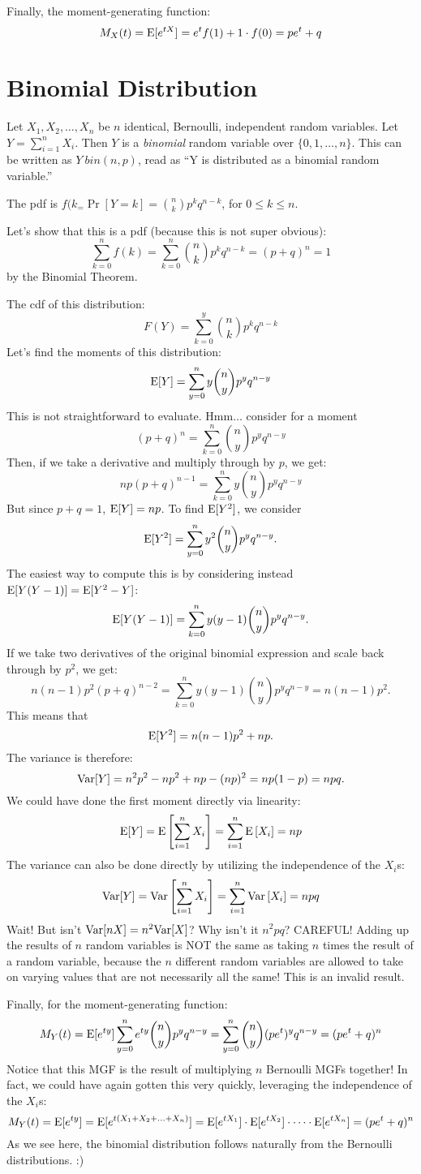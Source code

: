 \documentclass[../main.tex]{subfiles}
\begin{document}
Finally, the moment-generating function: 
\[
    M_X(t) = \mathrm E[e^{tX}] = e^t f(1) + 1 \cdot f(0) = p e^t + q 
\]
\section{Binomial Distribution}
Let $X_1, X_2, \dots, X_n$ be $n$ identical, Bernoulli, independent random variables. Let $Y = \sum_{i=1}^n X_i$. Then $Y$ is a \textit{binomial} random variable over $\{0, 1, \dots, n\}$. This can be written as $Y ~ bin(n,p)$, read as ``Y is distributed as a binomial random variable.''

The pdf is $f(k_ = \Pr[Y=k] = \binom{n}{k} p^k q^{n-k}$, for $0 \leq k \leq n$. 

Let's show that this is a pdf (because this is not super obvious): 
\[
    \sum_{k=0}^n f(k) = \sum_{k=0}^n \binom{n}{k} p^k q^{n-k} = (p+q)^n = 1
\]
by the Binomial Theorem. 

The cdf of this distribution: 
\[
    F(Y) = \sum_{k=0}^y \binom{n}{k} p^k q^{n-k}
\]
Let's find the moments of this distribution: 
\[
    \mathrm E[Y] = \sum_{y=0}^n y \binom{n}{y} p^y q^{n-y}
\]
This is not straightforward to evaluate. Hmm$\dots$ consider for a moment
\[
    (p+q)^n = \sum_{k=0}^n \binom{n}{y} p^y q^{n-y}
\]
Then, if we take a derivative and multiply through by $p$, we get: 
\[
np(p+q)^{n-1} = \sum_{k=0}^n y \binom{n}{y} p^y q^{n-y}
\]
But since $p+q = 1$, $\mathrm E[Y] = np$. 
To find $\mathrm E[Y^2]$, we consider 
\[
    \mathrm E[Y^2] = \sum_{y=0}^n y^2 \binom n y p^y q^{n-y}.
\]
The easiest way to compute this is by considering instead $\mathrm E[Y(Y-1)] = \mathrm E[Y^2 - Y]$: 
\[
    \mathrm E[Y(Y-1)] = \sum_{k=0}^n y(y-1) \binom n y p^y q^{n-y}.
\]
If we take two derivatives of the original binomial expression and scale back through by $p^2$, we get: 
\[
    n(n-1)p^2(p+q)^{n-2} =  \sum_{k=0}^n y(y-1) \binom n y p^y q^{n-y} = n(n-1)p^2.
\]
This means that
\[
    \mathrm E[Y^2] = n(n-1)p^2 + np.
\]
The variance is therefore:
\[
    \mathrm{Var}[Y]= n^2p^2 - np^2 + np - (np)^2 = np(1-p) = npq.
\]
We could have done the first moment directly via linearity: 
\[
    \mathrm E[Y] = \mathrm E\left[\sum_{i=1}^n X_i \right] = \sum_{i=1}^n \mathrm E\left[ X_i \right] = np 
\]
The variance can also be done directly by utilizing the independence of the $X_i$s: 
\[
    \mathrm{Var}[Y] = \mathrm{Var}\left[\sum_{i=1}^n X_i \right] = \sum_{i=1}^n \mathrm{Var}\left[ X_i \right] = npq
\]
Wait! But isn't $\mathrm{Var}[nX] = n^2 \mathrm{Var}[X]$? Why isn't it $n^2pq$? CAREFUL! Adding up the results of $n$ random variables is NOT the same as taking $n$ times the result of a random variable, because the $n$ different random variables are allowed to take on varying values that are not necessarily all the same! This is an invalid result. 

Finally, for the moment-generating function: 
\[
    M_Y(t) = \mathrm E[e^{ty}] \sum_{y=0}^n e^{ty} \binom ny p^y q^{n-y} = \sum_{y=0}^n  \binom n y (pe^t)^y q^{n-y} = (pe^t + q)^n 
\]
Notice that this MGF is the result of multiplying $n$ Bernoulli MGFs together! In fact, we could have again gotten this very quickly, leveraging the independence of the $X_i$s: 
\[
   M_Y(t) = \mathrm E[e^{ty}] = \mathrm E[e^{t(X_1 + X_2 + \ldots + X_n)}] = \mathrm E[e^{tX_1}] \cdot \mathrm E[e^{tX_2}]  \cdot \dots \cdot \mathrm E[e^{tX_n}] = (pe^t + q)^n
\]
As we see here, the binomial distribution follows naturally from the Bernoulli distributions. :)
\end{document}
